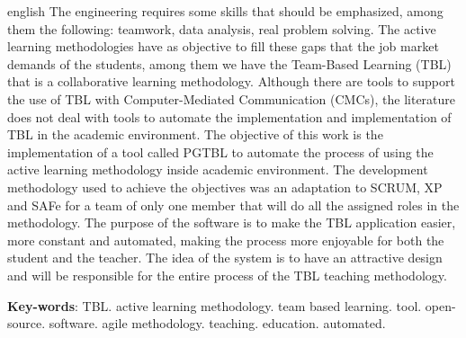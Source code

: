 \begin{resumo}[Abstract]
 \begin{otherlanguage*}{english}
   The engineering requires some skills that should be emphasized, among them the following: teamwork, data analysis,
   real problem solving. The active learning methodologies have as objective to fill these gaps that the job market
   demands of the students, among them we have the Team-Based Learning (TBL) that is a collaborative learning
   methodology. Although there are tools to support the use of TBL with Computer-Mediated Communication (CMCs), the
   literature does not deal with tools to automate the implementation and implementation of TBL in the academic
   environment. The objective of this work is the implementation of a tool called PGTBL to automate the process of
   using the active learning methodology inside academic environment. The development methodology used to achieve
   the objectives was an adaptation to SCRUM, XP and SAFe for a team of only one member that will do all the assigned
   roles in the methodology. The purpose of the software is to make the TBL application easier, more constant
   and automated, making the process more enjoyable for both the student and the teacher. The idea of the system is
   to have an attractive design and will be responsible for the entire process of the TBL teaching methodology.

   \vspace{\onelineskip}

   \noindent
   \textbf{Key-words}: TBL. active learning methodology. team based learning. tool. open-source. software. agile
   methodology. teaching. education. automated.
 \end{otherlanguage*}
\end{resumo}
